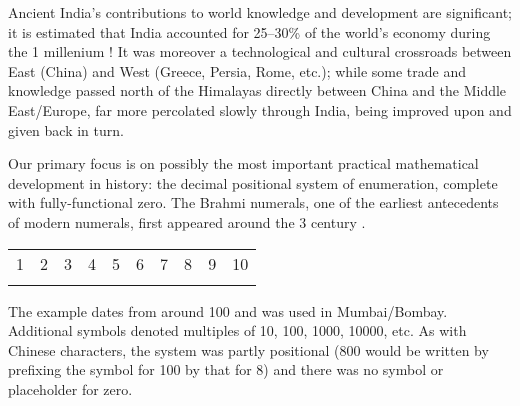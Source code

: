 Ancient India's contributions to world knowledge and development are significant; it is estimated that India accounted for 25--30\% of the world's economy during the 1\st{} millenium \!\AD\!! It was moreover a technological and cultural crossroads between East (China) and West (Greece, Persia, Rome, etc.); while some trade and knowledge passed north of the Himalayas directly between China and the Middle East/Europe, far more percolated slowly through India, being improved upon and given back in turn.


% 
% 
% 
% 
% 


Our primary focus is on possibly the most important practical mathematical development in history: the decimal positional system of enumeration, complete with fully-functional zero. The Brahmi numerals, one of the earliest antecedents of modern numerals, first appeared around the 3\rd{} century \BC{}.
\begin{center}
	\begin{tabular}{cccccccccc}
		1&2&3&4&5&6&7&8&9&10\\
		\IndiaBone&\IndiaBtwo&\IndiaBthree&\IndiaBfour&\IndiaBfive&\IndiaBsix&\IndiaBseven&\IndiaBeight&\IndiaBnine&\IndiaBten
	\end{tabular}
\end{center}
The example dates from around 100\BC{} and was used in Mumbai/Bombay. Additional symbols denoted multiples of 10, 100, 1000, 10000, etc. As with Chinese characters, the system was partly positional (800 would be written by prefixing the symbol for 100 by that for 8) and there was no symbol or placeholder for zero.
\goodbreak

